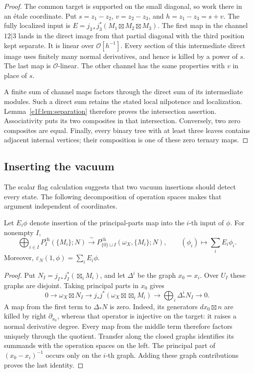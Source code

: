 \begin{proof}
The common target is supported on the small diagonal, so work
there in an \'etale coordinate. Put
\(s=z_1-z_2\), \(v=z_2-z_3\), and \(h=z_1-z_3=s+v\).
The fully localized input is
\(E=j_{3*}j_3^*(M_1\boxtimes M_2\boxtimes M_3)\).
The first map in the channel \(12|3\) lands in the direct
image from that partial diagonal with the third position kept
separate. It is linear over \(\mathcal O[h^{-1}]\).
Every section of this intermediate direct image uses finitely
many normal derivatives, and hence is killed by a power of
\(s\). The last map is \(\mathcal O\)-linear.
The other channel has the same properties with \(v\) in place
of \(s\).

A finite sum of channel maps factors through the direct sum of
its intermediate modules. Such a direct sum retains the stated
local nilpotence and localization. Lemma~\ref{e1f:lem:separation}
therefore proves the intersection assertion. Associativity
puts its two composites in that intersection. Conversely, two
zero composites are equal. Finally, every binary tree with at
least three leaves contains adjacent internal vertices; their
composition is one of these zero ternary maps.
\end{proof}

\subsection{Inserting the vacuum}

The scalar flag calculation suggests that two vacuum insertions
should detect every state. The following decomposition of
operation spaces makes that argument independent of coordinates.

\begin{lemma}
\label{e1f:lem:insert}
Let \(E_i\phi\) denote insertion of the principal-parts map
into the \(i\)-th input of \(\phi\). For nonempty \(I\),
\[
 \bigoplus_{i\in I}P_I^{\mathrm{ch}}(\{M_i\};N)
 \xrightarrow{\ \sim\ }
 P_{\{0\}\sqcup I}^{\mathrm{ch}}(\omega_X,\{M_i\};N),
 \qquad (\phi_i)\longmapsto\sum_iE_i\phi_i.
\]
Moreover, \(\varepsilon_N(1,\phi)=\sum_iE_i\phi\).
\end{lemma}

\begin{proof}
Put \(N_I=j_{I*}j_I^*(\boxtimes_iM_i)\), and let
\(\Delta^i\) be the graph \(x_0=x_i\). Over \(U_I\) these
graphs are disjoint. Taking principal parts in \(x_0\) gives
\[
 0\longrightarrow\omega_X\boxtimes N_I
 \longrightarrow j_*j^*(\omega_X\boxtimes\boxtimes_iM_i)
 \longrightarrow\bigoplus_i\Delta^i_*N_I
 \longrightarrow0.
\]
A map from the first term to \(\Delta_*N\) is zero. Indeed,
its generators \(dx_0\boxtimes n\) are killed by right
\(\partial_{x_0}\), whereas that operator is injective on
the target: it raises a normal derivative degree.
Every map from the middle term therefore factors uniquely
through the quotient. Transfer along the closed graphs
identifies its summands with the operation spaces on the left.
The principal part of \((x_0-x_i)^{-1}\) occurs only on the
\(i\)-th graph. Adding these graph contributions proves the
last identity.
\end{proof}

